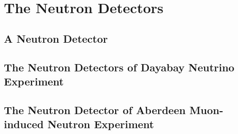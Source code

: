 
\chapter{The Neutron Detectors}

\section{A Neutron Detector}

\section{The Neutron Detectors of Dayabay Neutrino Experiment}

\section{The Neutron Detector of Aberdeen Muon-induced Neutron Experiment}
